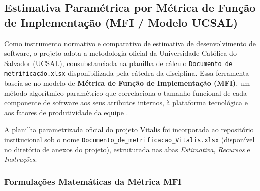 \subsection{Estimativa Paramétrica por Métrica de Função de Implementação (MFI / Modelo UCSAL)}

Como instrumento normativo e comparativo de estimativa de desenvolvimento de software, o projeto adota a metodologia oficial da Universidade Católica do Salvador (UCSAL), consubstanciada na planilha de cálculo \texttt{Documento de metrificação.xlsx} disponibilizada pela cátedra da disciplina. Essa ferramenta baseia-se no modelo de \textbf{Métrica de Função de Implementação (MFI)}, um método algorítmico paramétrico que correlaciona o tamanho funcional de cada componente de software aos seus atributos internos, à plataforma tecnológica e aos fatores de produtividade da equipe \cite{pressman:2016}.

A planilha parametrizada oficial do projeto Vitalis foi incorporada ao repositório institucional sob o nome \texttt{Documento\_de\_metrificacao\_Vitalis.xlsx} (disponível no diretório de anexos do projeto), estruturada nas abas \textit{Estimativa}, \textit{Recursos} e \textit{Instruções}.

\subsubsection{Formulações Matemáticas da Métrica MFI}

